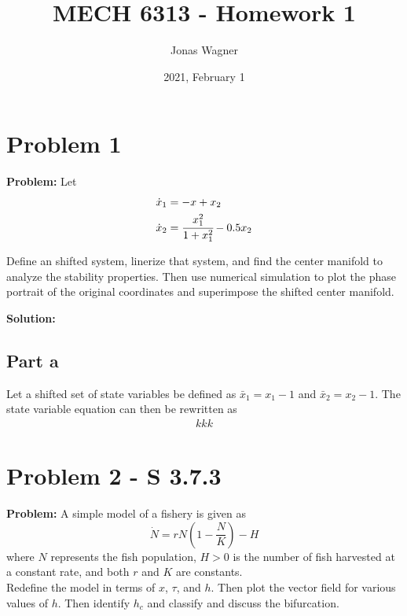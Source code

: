 \documentclass[letter]{article}
\title{MECH 6313 - Homework 1}
\author{Jonas Wagner}
\date{2021, February 1}
\begin{document}
\maketitle


\section{Problem 1}
\textbf{Problem:}
Let
\begin{equation}
	\begin{aligned}
		\dot{x}_1 &= -x + x_2\\
		\dot{x}_2 &= \cfrac{x_1^2}{1 + x_1^2} - 0.5 x_2
	\end{aligned}
\end{equation}

Define an shifted system, linerize that system, and find the center manifold to analyze the stability properties. Then use numerical simulation to plot the phase portrait of the original coordinates and superimpose the shifted center manifold.

\textbf{Solution:}
\subsection{Part a}
Let a shifted set of state variables be defined as $\bar{x}_1 = x_1 - 1$ and $\bar{x}_2 = x_2 - 1$. The state variable equation can then be rewritten as
\begin{equation}
	\begin{aligned}
		kkk
	\end{aligned}
\end{equation}

















\newpage
\section{Problem 2 - S 3.7.3}
\textbf{Problem:}
A simple model of a fishery is given as
\begin{equation}
	\dot{N} = r N (1 - \frac{N}{K}) - H
\end{equation}
where $N$ represents the fish population, $H > 0$ is the number of fish harvested at a constant rate, and both $r$ and $K$ are constants.\\
Redefine the model in terms of $x$, $\tau$, and $h$. Then plot the vector field for various values of $h$. Then identify $h_c$ and classify and discuss the bifurcation.\\
\end{document}

